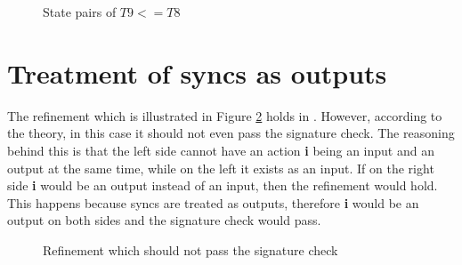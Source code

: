 \begin{figure}
\caption{State pairs of $T9<=T8$}
\label{fig:statePairsT9T8}
\end{figure}


\section{Treatment of syncs as outputs}\label{sec:case3}
The refinement which is illustrated in Figure \ref{fig:P8||P9<=P10} holds in \ecdar. However, according to the theory, in this case it should not even pass the signature check. The reasoning behind this is that the left side cannot have an action \textbf{i} being an input and an output at the same time, while on the left it exists as an input. If on the right side \textbf{i} would be an output  instead of an input, then the refinement would hold. This happens because syncs are treated as outputs, therefore \textbf{i} would be an output on both sides and the signature check would pass.
\begin{figure}
\centering
{}
\caption{Refinement which should not pass the signature check} \label{fig:P8||P9<=P10}
\end{figure}